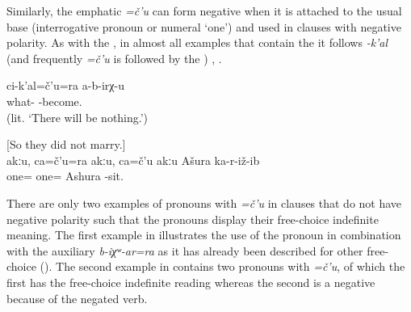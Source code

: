 Similarly, the emphatic  \textit{=č'u} can form negative  when it is attached to the usual base (interrogative pronoun or numeral `one') and used in clauses with negative polarity. As with the , in almost all examples that contain the  it follows \textit{-k'al} (and frequently \textit{=č'u} is followed by the ) , . 

\begin{exe}
	\ex	\label{ex:Nothing bad will happen.} 
	\gll	ci-k'al=č'u=ra	a-b-irχ-u\\
		what-	-become.\\
	\glt	{} (lit. `There will be nothing.')

	\ex	\label{ex:No, there was no one, except for Ashura he did not marry anyone.} [So they did not marry.]\\
	\gll	akːu,		ca=č'u=ra	akːu,	ca=č'u	akːu	Ašura	ka-r-iž-ib\\
				one=			one=		Ashura	-sit.\\
	\glt	{}
\end{exe}

There are only two examples of pronouns with \textit{=č'u} in clauses that do not have negative polarity such that the pronouns display their free-choice indefinite meaning. The first example in  illustrates the use of the pronoun in combination with the  auxiliary \textit{b-iχʷ-ar=ra} as it has already been described for other free-choice  (). The second example in  contains two pronouns with \textit{=č'u}, of which the first has the free-choice indefinite reading whereas the second is a negative  because of the negated verb.


